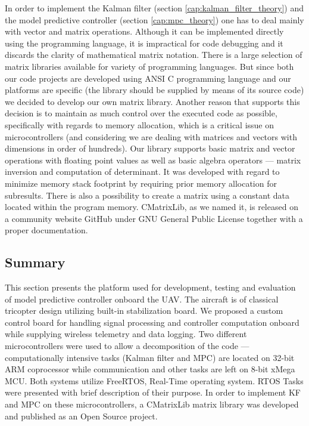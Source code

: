 In order to implement the Kalman filter (section \ref{cap:kalman_filter_theory}) and the model predictive controller (section \ref{cap:mpc_theory}) one has to deal mainly with vector and matrix operations. Although it can be implemented directly using the programming language, it is impractical for code debugging and it discards the clarity of mathematical matrix notation. There is a large selection of matrix libraries \citep{matrixlibraries} available for variety of programming languages. But since both our code projects are developed using ANSI C programming language and our platforms are specific (the library should be supplied by means of its source code) we decided to develop our own matrix library. Another reason that supports this decision is to maintain as much control over the executed code as possible, specifically with regards to memory allocation, which is a critical issue on microcontrollers (and considering we are dealing with matrices and vectors with dimensions in order of hundreds). Our library supports basic matrix and vector operations with floating point values as well as basic algebra operators --- matrix inversion and computation of determinant. It was developed with regard to minimize memory stack footprint by requiring prior memory allocation for subresults. There is also a possibility to create a matrix using a constant data located within the program memory. CMatrixLib, as we named it, is released on a community website GitHub \citep{cmatrixlib} under GNU General Public License together with a proper documentation.

\subsection{Summary}

This section presents the platform used for development, testing and evaluation of model predictive controller onboard the UAV. The aircraft is of classical tricopter design utilizing built-in stabilization board. We proposed a custom control board for handling signal processing and controller computation onboard while supplying wireless telemetry and data logging. Two different microcontrollers were used to allow a decomposition of the code --- computationally intensive tasks (Kalman filter and MPC) are located on 32-bit ARM coprocessor while communication and other tasks are left on 8-bit xMega MCU. Both systems utilize FreeRTOS, Real-Time operating system. RTOS Tasks were presented with brief description of their purpose. In order to implement KF and MPC on these microcontrollers, a CMatrixLib matrix library was developed and published as an Open Source project. 